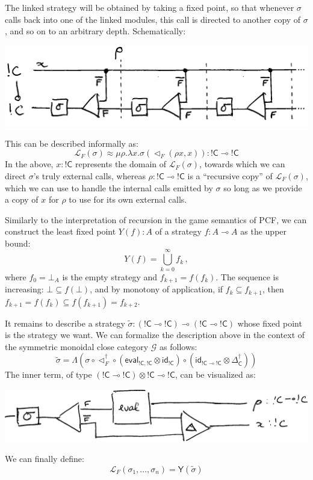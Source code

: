 \documentclass[acmsmall,anonymous]{acmart}
\newcommand{\kw}[1]{\ensuremath{ \textsf{#1} }}
\newcommand{\EC}{\kw{C}}
\begin{document}
The linked strategy will be obtained by taking a fixed point,
so that whenever $\sigma$ calls back into one of the linked modules,
this call is directed to another copy of $\sigma$,
and so on to an arbitrary depth.
Schematically:
\begin{center}
  \includegraphics[scale=0.7]{linking-operator}
\end{center}
This can be described informally as:
\[
  \mathcal{L}_F(\sigma) \approx
  \mu \rho . \lambda x . \sigma (\lhd_F (\rho x, x))
  : {!\EC} \multimap {!\EC}
\]
In the above,
$x : {!\EC}$ represents the domain of $\mathcal{L}_F(\sigma)$,
towards which we can direct $\sigma$'s truly external calls,
whereas $\rho : {!\EC} \multimap {!\EC}$ is a ``recursive copy'' of $\mathcal{L}_F(\sigma)$,
which we can use to handle the internal calls emitted by $\sigma$
so long as we provide a copy of $x$
for $\rho$ to use for its own external calls.

Similarly to the interpretation of recursion
in the game semantics of PCF,
we can construct the least fixed point $Y(f) : A$
of a strategy $f : A \multimap A$
as the upper bound:
\[
  Y(f) = \bigcup_{k=0}^\infty f_k\,,
\]
where $f_0 = \bot_{A}$ is the empty strategy
and $f_{k+1} = f(f_k)$.
The sequence is increasing:
$\bot \subseteq f(\bot)$,
and by monotony of application,
if $f_k \subseteq f_{k+1}$,
then $f_{k+1} = f(f_k) \subseteq f(f_{k+1}) = f_{k+2}$.

It remains to describe a strategy
$\tilde{\sigma} : ({!\EC} \multimap {!\EC}) \multimap ({!\EC} \multimap {!\EC})$
whose fixed point is the strategy we want.
We can formalize the description above
in the context of the symmetric monoidal close category $\mathcal{G}$
as follows:
\[
  \tilde{\sigma} =
    \Lambda
      \left(
      \sigma \circ
      \lhd_F^\dagger \circ
      (\kw{eval}_{{!\EC}, {!\EC}} \otimes \kw{id}_{!\EC}) \circ
      (\kw{id}_{{!\EC} \multimap {!\EC}} \otimes \Delta_\EC^\dagger)
      \right)
\]
The inner term,
of type $({!\EC} \multimap {!\EC}) \otimes {!\EC} \multimap {!\EC}$,
can be visualized as:
\begin{center}
  \includegraphics[scale=0.6]{linking-element}
\end{center}
We can finally define:
\[
  \mathcal{L}_F(\sigma_1, \ldots, \sigma_n) = \kw{Y}(\tilde{\sigma})
\]
\end{document}
